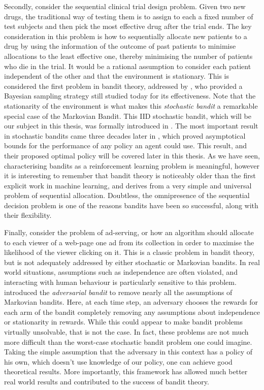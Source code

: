 \par Secondly, consider the sequential clinical trial design problem. Given two new drugs, the traditional way of testing them is to assign to each a fixed number of test subjects and then pick the most effective drug after the trial ends. The key consideration in this problem is how to sequentially allocate new patients to a drug by using the information of the outcome of past patients to minimise allocations to the least effective one, thereby minimising the number of patients who die in the trial. It would be a rational assumption to consider each patient independent of the other and that the environment is stationary. This is considered the first problem in bandit theory, addressed by \citet{thompson:1933}, who provided a Bayesian sampling strategy still studied today for its effectiveness\cite{agrawal:2012}. Note that the stationarity of the environment is what makes this {\em stochastic bandit} a remarkable special case of the Markovian Bandit. This IID stochastic bandit, which will be our subject in this thesis, was formally introduced in \citet{robbins:1952}. The most important result in stochastic bandits came three decades later in \citet{lai-robbins:1985}, which proved asymptotical bounds for the performance of any policy an agent could use. This result, and their proposed optimal policy will be covered later in this thesis. As we have seen, characterising bandits as a reinforcement learning problem is meaningful, however it is interesting to remember that bandit theory is noticeably older than the first explicit work in machine learning\cite{rosenblatt:1958,samuel:1959}, and derives from a very simple and universal problem of sequential allocation. Doubtless, the omnipresence of the sequential decision problem is one of the reasons bandits have been so successful, along with their flexibility. 

\par Finally, consider the problem of ad-serving, or how an algorithm should allocate to each viewer of a web-page one ad from its collection in order to maximise the likelihood of the viewer clicking on it. This is a classic problem in bandit theory\cite{vernade:2017,dudik:2011}, but is not adequately addressed by either stochastic or Markovian bandits. In real world situations, assumptions such as independence are often violated, and interacting with human behaviour is particularly sensitive to this problem. \citet{auer:1995} introduced the {\em adversarial bandit} to remove nearly all the assumptions of Markovian bandits. Here, at each time step, an adversary chooses the rewards for each arm of the bandit completely removing any assumptions about independence or stationarity in rewards. While this could appear to make bandit problems virtually unsolvable, that is not the case. In fact, these problems are not much more difficult than the worst-case stochastic bandit problem one could imagine\cite{bubeck:2012}. Taking the simple assumption that the adversary in this context has a policy of his own, which doesn't use knowledge of our policy, one can achieve good theoretical results. More importantly, this framework has allowed much better real world results and contributed to the success of bandit theory.

